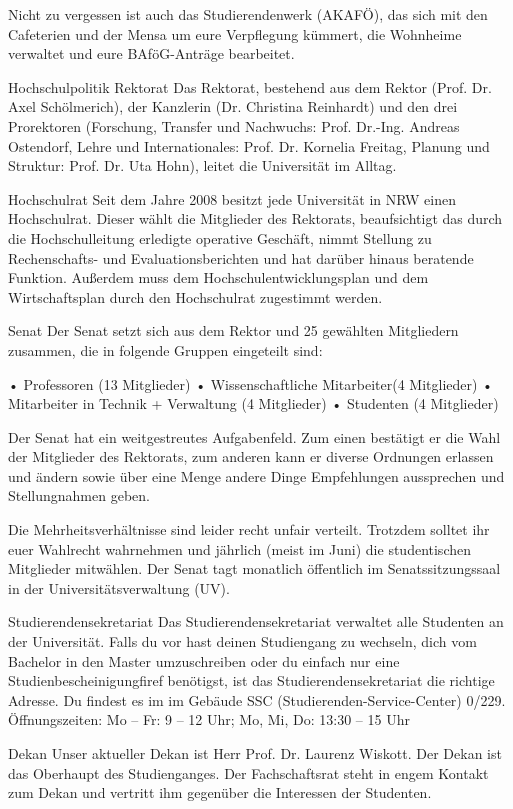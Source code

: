 Nicht zu vergessen ist auch das Studierendenwerk (AKAFÖ), das sich mit den Cafeterien und der Mensa um eure Verpflegung kümmert, die Wohnheime verwaltet und eure BAföG-Anträge bearbeitet.



Hochschulpolitik
Rektorat
Das Rektorat, bestehend aus dem Rektor (Prof. Dr. Axel Schölmerich), der Kanzlerin (Dr. Christina Reinhardt) und den drei Prorektoren (Forschung, Transfer und Nachwuchs: Prof. Dr.-Ing. Andreas Ostendorf, Lehre und Internationales: Prof. Dr. Kornelia Freitag, Planung und Struktur: Prof. Dr. Uta Hohn), leitet die Universität im Alltag.

Hochschulrat
Seit dem Jahre 2008 besitzt jede Universität in NRW einen Hochschulrat. Dieser wählt die Mitglieder des Rektorats, beaufsichtigt das durch die Hochschulleitung erledigte operative Geschäft, nimmt Stellung zu Rechenschafts- und Evaluationsberichten und hat darüber hinaus beratende Funktion. Außerdem muss dem Hochschulentwicklungsplan und dem Wirtschaftsplan durch den Hochschulrat zugestimmt werden.

Senat
Der Senat setzt sich aus dem Rektor und 25 gewählten Mitgliedern zusammen, die in folgende Gruppen eingeteilt sind:

•	Professoren (13 Mitglieder)
•	Wissenschaftliche Mitarbeiter(4 Mitglieder)
•	Mitarbeiter in Technik + Verwaltung (4 Mitglieder)
•	Studenten (4 Mitglieder)

Der Senat hat ein weitgestreutes Aufgabenfeld. Zum einen bestätigt er die Wahl der Mitglieder des Rektorats, zum anderen kann er diverse Ordnungen erlassen und ändern sowie über eine Menge andere Dinge Empfehlungen aussprechen und Stellungnahmen geben.

Die Mehrheitsverhältnisse sind leider recht unfair verteilt. Trotzdem solltet ihr euer Wahlrecht wahrnehmen und jährlich (meist im Juni) die studentischen Mitglieder mitwählen. Der Senat tagt monatlich öffentlich im Senatssitzungssaal in der Universitätsverwaltung (UV).


Studierendensekretariat
Das Studierendensekretariat verwaltet alle Studenten an der Universität. Falls du vor hast deinen Studiengang zu wechseln, dich vom Bachelor in den Master umzuschreiben oder du einfach nur eine Studienbescheinigungfiref benötigst, ist das Studierendensekretariat die richtige Adresse. Du findest es im im Gebäude SSC (Studierenden-Service-Center) 0/229. Öffnungszeiten: Mo – Fr: 9 – 12 Uhr; Mo, Mi, Do: 13:30 – 15 Uhr

Dekan
Unser aktueller Dekan ist Herr Prof. Dr. Laurenz Wiskott. Der Dekan ist das Oberhaupt des Studienganges. Der Fachschaftsrat steht in engem Kontakt zum Dekan und vertritt ihm gegenüber die Interessen der Studenten.

